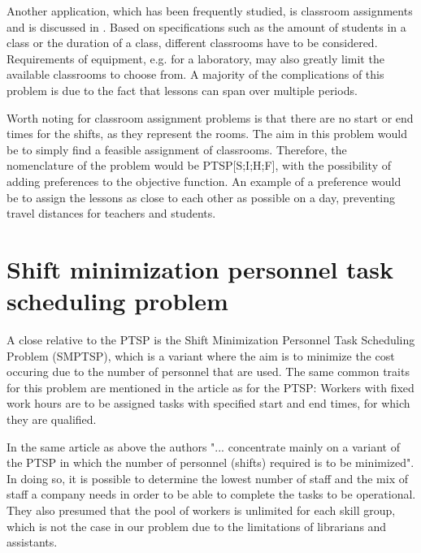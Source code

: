 Another application, which has been frequently studied, is classroom assignments and is discussed in \citet{krishnamoorthy_2001}. Based on specifications such as the amount of students in a class or the duration of a class, different classrooms have to be considered. Requirements of equipment, e.g. for a laboratory, may also greatly limit the available classrooms to choose from. A majority of the complications of this problem is due to the fact that lessons can span over multiple periods. 

Worth noting for classroom assignment problems is that there are no start or end times for the shifts, as they represent the rooms. The aim in this problem would be to simply find a feasible assignment of classrooms. Therefore, the nomenclature of the problem would be PTSP[S;I;H;F], with the possibility of adding preferences to the objective function. An example of a preference would be to assign the lessons as close to each other as possible on a day, preventing travel distances for teachers and students.



%
%



\section{Shift minimization personnel task scheduling problem}\label{SMTSP}
A close relative to the PTSP is the Shift Minimization Personnel Task Scheduling Problem (SMPTSP), which is a variant where the aim is to minimize the cost occuring due to the number of personnel that are used. The same common traits for this problem are mentioned in the article \citet{krishnamoorthy_2012} as for the PTSP: Workers with fixed work hours are to be assigned tasks with specified start and end times, for which they are qualified.

In the same article as above the authors "... concentrate mainly on a variant of the PTSP in which the number of personnel (shifts) required is to be minimized". In doing so, it is possible to determine the lowest number of staff and the mix of staff a company needs in order to be able to complete the tasks to be operational. They also presumed that the pool of workers is unlimited for each skill group, which is not the case in our problem due to the limitations of librarians and assistants. 

